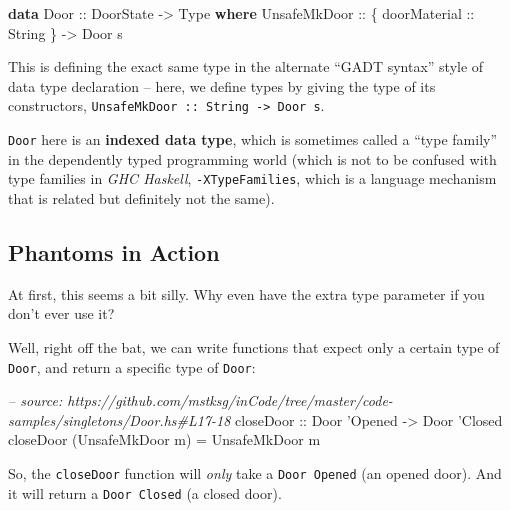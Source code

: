 \documentclass[]{article}
\newenvironment{Shaded}{\begin{snugshade}}{\end{snugshade}}
\newcommand{\CharTok}[1]{\textcolor[rgb]{0.31,0.60,0.02}{#1}}
\newcommand{\CommentTok}[1]{\textcolor[rgb]{0.56,0.35,0.01}{\textit{#1}}}
\newcommand{\DataTypeTok}[1]{\textcolor[rgb]{0.13,0.29,0.53}{#1}}
\newcommand{\FunctionTok}[1]{\textcolor[rgb]{0.00,0.00,0.00}{#1}}
\newcommand{\KeywordTok}[1]{\textcolor[rgb]{0.13,0.29,0.53}{\textbf{#1}}}
\newcommand{\NormalTok}[1]{#1}
\newcommand{\OtherTok}[1]{\textcolor[rgb]{0.56,0.35,0.01}{#1}}
\begin{document}
\begin{Shaded}
\begin{Highlighting}[]
\KeywordTok{data} \DataTypeTok{Door}\OtherTok{ ::} \DataTypeTok{DoorState} \OtherTok{->} \DataTypeTok{Type} \KeywordTok{where}
    \DataTypeTok{UnsafeMkDoor}\OtherTok{ ::}\NormalTok{ \{}\OtherTok{ doorMaterial ::} \DataTypeTok{String}\NormalTok{ \} }\OtherTok{->} \DataTypeTok{Door}\NormalTok{ s}
\end{Highlighting}
\end{Shaded}

This is defining the exact same type in the alternate ``GADT syntax'' style of
data type declaration -- here, we define types by giving the type of its
constructors, \texttt{UnsafeMkDoor\ ::\ String\ -\textgreater{}\ Door\ s}.

\texttt{Door} here is an \textbf{indexed data type}, which is sometimes called a
``type family'' in the dependently typed programming world (which is not to be
confused with type families in \emph{GHC Haskell}, \texttt{-XTypeFamilies},
which is a language mechanism that is related but definitely not the same).

\hypertarget{phantoms-in-action}{%
\subsection{Phantoms in Action}\label{phantoms-in-action}}

At first, this seems a bit silly. Why even have the extra type parameter if you
don't ever use it?

Well, right off the bat, we can write functions that expect only a certain type
of \texttt{Door}, and return a specific type of \texttt{Door}:

\begin{Shaded}
\begin{Highlighting}[]
\CommentTok{-- source: https://github.com/mstksg/inCode/tree/master/code-samples/singletons/Door.hs#L17-18}
\OtherTok{closeDoor ::} \DataTypeTok{Door} \CharTok{'Opened -> Door '}\DataTypeTok{Closed}
\NormalTok{closeDoor (}\DataTypeTok{UnsafeMkDoor}\NormalTok{ m) }\FunctionTok{=} \DataTypeTok{UnsafeMkDoor}\NormalTok{ m}
\end{Highlighting}
\end{Shaded}

So, the \texttt{closeDoor} function will \emph{only} take a
\texttt{Door\ \textquotesingle{}Opened} (an opened door). And it will return a
\texttt{Door\ \textquotesingle{}Closed} (a closed door).
\end{document}
